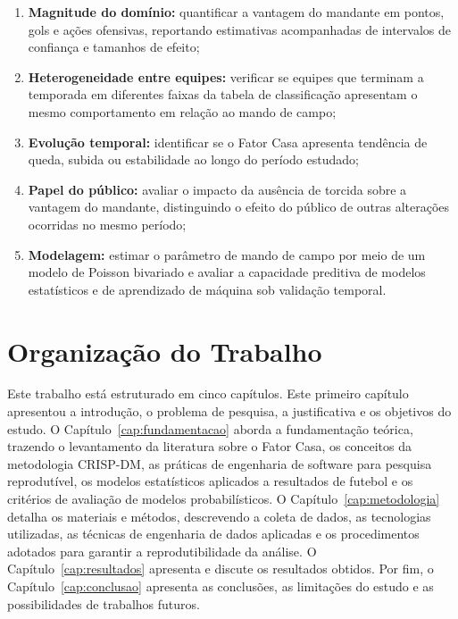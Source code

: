 \begin{enumerate}
  \item \textbf{Magnitude do domínio:} quantificar a vantagem do mandante em
    pontos, gols e ações ofensivas, reportando estimativas acompanhadas de
    intervalos de confiança e tamanhos de efeito;
  \item \textbf{Heterogeneidade entre equipes:} verificar se equipes que
    terminam a temporada em diferentes faixas da tabela de classificação
    apresentam o mesmo comportamento em relação ao mando de campo;
  \item \textbf{Evolução temporal:} identificar se o Fator Casa apresenta
    tendência de queda, subida ou estabilidade ao longo do período estudado;
  \item \textbf{Papel do público:} avaliar o impacto da ausência de torcida
    sobre a vantagem do mandante, distinguindo o efeito do público de outras
    alterações ocorridas no mesmo período;
  \item \textbf{Modelagem:} estimar o parâmetro de mando de campo por meio de um
    modelo de Poisson bivariado e avaliar a capacidade preditiva de modelos
    estatísticos e de aprendizado de máquina sob validação temporal.
\end{enumerate}

\section{Organização do Trabalho}\label{sec:organizacao}

Este trabalho está estruturado em cinco capítulos. Este primeiro capítulo
apresentou a introdução, o problema de pesquisa, a justificativa e os objetivos
do estudo. O Capítulo~\ref{cap:fundamentacao} aborda a fundamentação teórica,
trazendo o levantamento da literatura sobre o Fator Casa, os conceitos da
metodologia CRISP-DM, as práticas de engenharia de software para pesquisa
reprodutível, os modelos estatísticos aplicados a resultados de futebol e os
critérios de avaliação de modelos probabilísticos. O
Capítulo~\ref{cap:metodologia} detalha os materiais e métodos, descrevendo a
coleta de dados, as tecnologias utilizadas, as técnicas de engenharia de dados
aplicadas e os procedimentos adotados para garantir a reprodutibilidade da
análise. O Capítulo~\ref{cap:resultados} apresenta e discute os resultados
obtidos. Por fim, o Capítulo~\ref{cap:conclusao} apresenta as conclusões, as
limitações do estudo e as possibilidades de trabalhos futuros.
